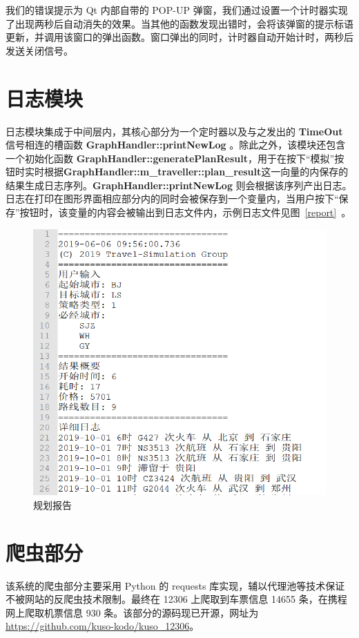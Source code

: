 \documentclass[lang=cn,blue,13pt]{elegantbook}
\begin{document}
我们的错误提示为 Qt 内部自带的 POP-UP 弹窗，我们通过设置一个计时器实现了出现两秒后自动消失的效果。当其他的函数发现出错时，会将该弹窗的提示标语更新，并调用该窗口的弹出函数。窗口弹出的同时，计时器自动开始计时，两秒后发送关闭信号。

\chapter{日志模块}
日志模块集成于中间层内，其核心部分为一个定时器以及与之发出的 \textbf{TimeOut} 信号相连的槽函数 \textbf{GraphHandler::printNewLog
}。除此之外，该模块还包含一个初始化函数 \textbf{GraphHandler::generatePlanResult}，用于在按下``模拟''按钮时实时根据\textbf{GraphHandler::m\_traveller::plan\_result}这一向量的内保存的结果生成日志序列。\textbf{GraphHandler::printNewLog} 则会根据该序列产出日志。日志在打印在图形界面相应部分内的同时会被保存到一个变量内，当用户按下``保存''按钮时，该变量的内容会被输出到日志文件内，示例日志文件见图~\ref{report}~。

\begin{figure}[!htbp]
	\centering
	\includegraphics[width=.9\textwidth]{report.png}
	\caption{规划报告}
	\label{result}
\end{figure}

\chapter{爬虫部分}
该系统的爬虫部分主要采用 Python 的 requests 库实现，辅以代理池等技术保证不被网站的反爬虫技术限制。最终在 12306 上爬取到车票信息 14655 条，在携程网上爬取机票信息 930 条。该部分的源码现已开源，网址为 \href{https://github.com/kuso-kodo/kuso\_12306}{https://github.com/kuso-kodo/kuso\_12306}。
\end{document}
